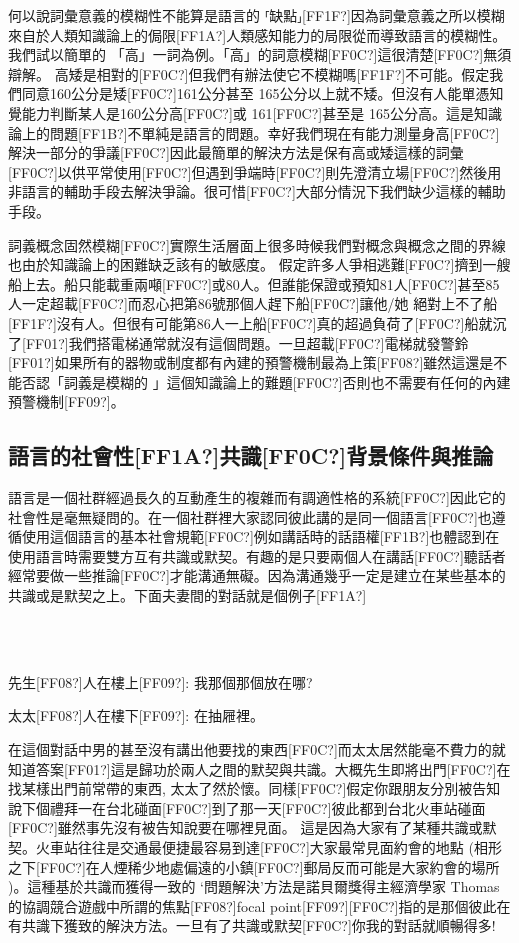 何以說詞彙意義的模糊性不能算是語言的 ⸢缺點⸥[FF1F?]因為詞彙意義之所以模糊來自於人類知識論上的侷限[FF1A?]人類感知能力的局限從而導致語言的模糊性。我們試以簡單的 「高」一詞為例。「高」的詞意模糊[FF0C?]這很清楚[FF0C?]無須辯解。 高矮是相對的[FF0C?]但我們有辦法使它不模糊嗎[FF1F?]不可能。假定我們同意160公分是矮[FF0C?]161公分甚至 165公分以上就不矮。但沒有人能單憑知覺能力判斷某人是160公分高[FF0C?]或 161[FF0C?]甚至是 165公分高。這是知識論上的問題[FF1B?]不單純是語言的問題。幸好我們現在有能力測量身高[FF0C?]解決一部分的爭議[FF0C?]因此最簡單的解決方法是保有高或矮這樣的詞彙[FF0C?]以供平常使用[FF0C?]但遇到爭端時[FF0C?]則先澄清立場[FF0C?]然後用非語言的輔助手段去解決爭論。很可惜[FF0C?]大部分情況下我們缺少這樣的輔助手段。

詞義概念固然模糊[FF0C?]實際生活層面上很多時候我們對概念與概念之間的界線也由於知識論上的困難缺乏該有的敏感度。 假定許多人爭相逃難[FF0C?]擠到一艘船上去。船只能載重兩噸[FF0C?]或80人。但誰能保證或預知81人[FF0C?]甚至85人一定超載[FF0C?]而忍心把第86號那個人趕下船[FF0C?]讓他/她 絕對上不了船[FF1F?]沒有人。但很有可能第86人一上船[FF0C?]真的超過負荷了[FF0C?]船就沉了[FF01?]我們搭電梯通常就沒有這個問題。一旦超載[FF0C?]電梯就發警鈴[FF01?]如果所有的器物或制度都有內建的預警機制最為上策[FF08?]雖然這還是不能否認「詞義是模糊的 」這個知識論上的難題[FF0C?]否則也不需要有任何的內建預警機制[FF09?]。

\subsection{語言的社會性[FF1A?]共識[FF0C?]背景條件與推論}  %

語言是一個社群經過長久的互動產生的複雜而有調適性格的系統[FF0C?]因此它的社會性是毫無疑問的。在一個社群裡大家認同彼此講的是同一個語言[FF0C?]也遵循使用這個語言的基本社會規範[FF0C?]例如講話時的話語權[FF1B?]也體認到在使用語言時需要雙方互有共識或默契。有趣的是只要兩個人在講話[FF0C?]聽話者經常要做一些推論[FF0C?]才能溝通無礙。因為溝通幾乎一定是建立在某些基本的共識或是默契之上。下面夫妻間的對話就是個例子[FF1A?]

\ea%
\label{ex:key:12}
\gll\\
\\
\glt
\z

先生[FF08?]人在樓上[FF09?]: 我那個那個放在哪?

太太[FF08?]人在樓下[FF09?]:  在抽屜裡。

在這個對話中男的甚至沒有講出他要找的東西[FF0C?]而太太居然能毫不費力的就知道答案[FF01?]這是歸功於兩人之間的默契與共識。大概先生即將出門[FF0C?]在找某樣出門前常帶的東西, 太太了然於懷。同樣[FF0C?]假定你跟朋友分別被告知說下個禮拜一在台北碰面[FF0C?]到了那一天[FF0C?]彼此都到台北火車站碰面[FF0C?]雖然事先沒有被告知說要在哪裡見面。 這是因為大家有了某種共識或默契。火車站往往是交通最便捷最容易到達[FF0C?]大家最常見面約會的地點 (相形之下[FF0C?]在人煙稀少地處偏遠的小鎮[FF0C?]郵局反而可能是大家約會的場所 )。這種基於共識而獲得一致的 ‘問題解決’方法是諾貝爾獎得主經濟學家 Thomas \parencite{Schelling1960} 的協調競合遊戲中所謂的焦點[FF08?]focal point[FF09?][FF0C?]指的是那個彼此在有共識下獲致的解決方法。一旦有了共識或默契[FF0C?]你我的對話就順暢得多!

